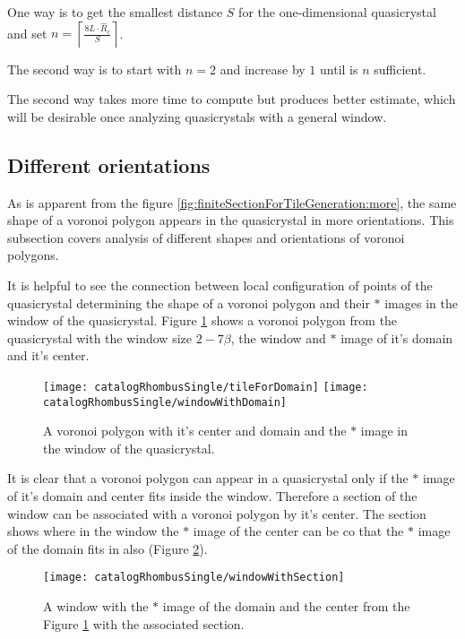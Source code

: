 \documentclass[text.tex]{subfiles}
\begin{document}
One way is to get the smallest distance $S$ for the one-dimensional quasicrystal and set $n = \left\lceil\frac{8L\cdot\hat{R}_c}{S}\right\rceil$. 

The second way is to start with $n=2$ and increase by $1$ until is $n$ sufficient. 

The second way takes more time to compute but produces better estimate, which will be desirable once analyzing quasicrystals with a general window.

\subsection{Different orientations}
As is apparent from the figure \ref{fig:finiteSectionForTileGeneration:more}, the same shape of a voronoi polygon appears in the quasicrystal in more orientations. This subsection covers analysis of different shapes and orientations of voronoi polygons. 

It is helpful to see the connection between local configuration of points of the quasicrystal determining the shape of a voronoi polygon and their $\ast$ images in the window of the quasicrystal. Figure \ref{fig:windowWithDomain} shows a voronoi polygon from the quasicrystal with the window size $2-7\beta$, the window and $\ast$ image of it's domain and it's center. 

\begin{figure}[h]
\centering
\texttt{[image: catalogRhombusSingle/tileForDomain]}
\texttt{[image: catalogRhombusSingle/windowWithDomain]}
\caption{A voronoi polygon with it's center and domain and the $\ast$ image in the window of the quasicrystal.}
\label{fig:windowWithDomain}
\end{figure}

It is clear that a voronoi polygon can appear in a quasicrystal only if the $\ast$ image of it's domain and center fits inside the window. Therefore a section of the window can be associated with a voronoi polygon by it's center. The section shows where in the window the $\ast$ image of the center can be co that the $\ast$ image of the domain fits in also (Figure \ref{fig:windowWithSection}). 

\begin{figure}[h]
\centering
\texttt{[image: catalogRhombusSingle/windowWithSection]}
\caption{A window with the $\ast$ image of the domain and the center from the Figure \ref{fig:windowWithDomain} with the associated section.}
\label{fig:windowWithSection}
\end{figure}
\end{document}
